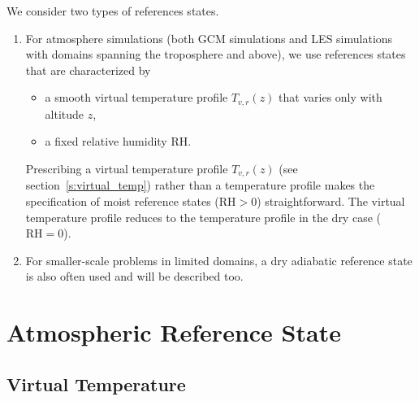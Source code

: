 \documentclass{report}
\begin{document}
We consider two types of references states. 
\begin{enumerate}
    \item For atmosphere simulations (both GCM simulations and LES simulations with domains spanning the troposphere and above), we use references states that are characterized by
\begin{itemize}
    \item a smooth virtual temperature profile $T_{v,r}(z)$ that varies only with altitude $z$,
    \item a fixed relative humidity RH.
\end{itemize}
Prescribing a virtual temperature profile $T_{v,r}(z)$ (see section~\ref{s:virtual_temp}) rather than a temperature profile makes the specification of moist reference states ($\mathrm{RH}>0$)  straightforward. The virtual temperature profile reduces to the temperature profile in the dry case ($\mathrm{RH}=0$).
\item For smaller-scale problems in limited domains, a dry adiabatic reference state is also often used and will be described too.
\end{enumerate}

\section{Atmospheric Reference State}

\subsection{Virtual Temperature}
\end{document}
